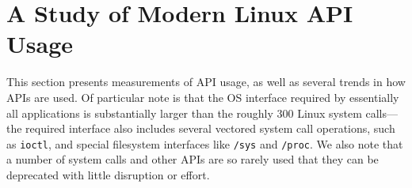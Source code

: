 \section{A Study of Modern Linux API Usage}
\label{sec:observation}


This section presents measurements of API usage,
as well as several trends in how APIs are used. Of particular note is that
the OS interface required by essentially all applications is 
substantially larger than the roughly 300 Linux system calls---the required interface
also includes several vectored system call operations, such as {\tt ioctl}, and special filesystem interfaces like {\tt /sys} and {\tt /proc}.
We also note that a number of system calls and other APIs are so rarely used that they can be deprecated with little disruption or effort.

